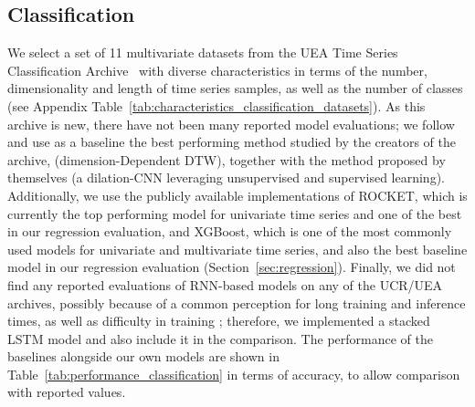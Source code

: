 \documentclass{article} \usepackage{iclr2021_conference,times}
\begin{document}
\subsection{Classification}

We select a set of 11 multivariate datasets from the UEA Time Series Classification Archive~\citep{bagnall_uea_2018} with diverse characteristics in terms of the number, dimensionality and length of time series samples, as well as the number of classes (see Appendix Table~\ref{tab:characteristics_classification_datasets}). As this archive is new, there have not been many reported model evaluations; we follow \cite{franceschi19} and use as a baseline the best performing method studied by the creators of the archive,  (dimension-Dependent DTW), together with the method proposed by \cite{franceschi19} themselves (a dilation-CNN leveraging unsupervised and supervised learning).
Additionally, we use the publicly available implementations \cite{Tan2020Time} of ROCKET, which is currently the top performing model for univariate time series and one of the best in our regression evaluation, and XGBoost, which is one of the most commonly used models for univariate and multivariate time series, and also the best baseline model in our regression evaluation (Section~\ref{sec:regression}). 
Finally, we did not find any reported evaluations of RNN-based models on any of the UCR/UEA archives, possibly because of a common perception for long training and inference times, as well as difficulty in training \citep{ismail_fawaz_deep_review2019}; therefore, we implemented a stacked LSTM model and also include it in the comparison. The performance of the baselines alongside our own models are shown in Table~\ref{tab:performance_classification} in terms of accuracy, to allow comparison with reported values.
\end{document}
